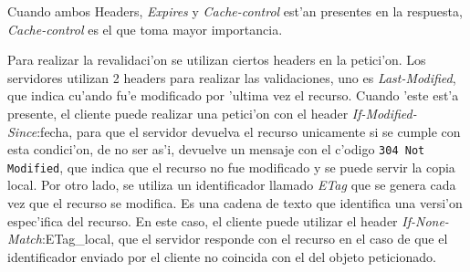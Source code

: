Cuando ambos Headers, \textsl{Expires} y \textsl{Cache-control} est'an presentes en la respuesta, \textsl{Cache-control} es el que toma mayor importancia.

Para realizar la revalidaci'on se utilizan ciertos headers en la petici'on. Los servidores utilizan 2 headers para realizar las validaciones, uno es \textsl{Last-Modified}, que indica cu'ando fu'e modificado por 'ultima vez el recurso. Cuando 'este est'a presente, el cliente puede realizar una petici'on con el header \textsl{If-Modified-Since}:fecha, para que el servidor devuelva el recurso unicamente si se cumple con esta condici'on, de no ser as'i, devuelve un mensaje con el c'odigo \texttt{304 Not Modified}, que indica que el recurso no fue modificado y se puede servir la copia local.
Por otro lado, se utiliza un identificador llamado \textsl{ETag} que se genera cada vez que el recurso se modifica. Es una cadena de texto que identifica una versi'on espec'ifica del recurso. En este caso, el cliente puede utilizar el header \textsl{If-None-Match}:ETag\_local, que el servidor responde con el recurso en el caso de que el identificador enviado por el cliente no coincida con el del objeto peticionado.